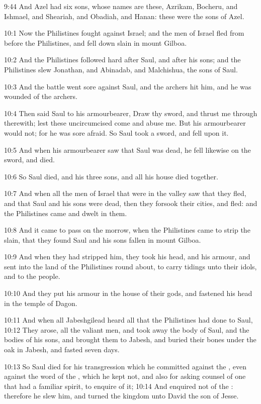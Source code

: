 9:44 And Azel had six sons, whose names are these, Azrikam, Bocheru, and Ishmael, and Sheariah, and Obadiah, and Hanan: these were the sons of Azel.

10:1 Now the Philistines fought against Israel; and the men of Israel fled from before the Philistines, and fell down slain in mount Gilboa.

10:2 And the Philistines followed hard after Saul, and after his sons; and the Philistines slew Jonathan, and Abinadab, and Malchishua, the sons of Saul.

10:3 And the battle went sore against Saul, and the archers hit him, and he was wounded of the archers.

10:4 Then said Saul to his armourbearer, Draw thy sword, and thrust me through therewith; lest these uncircumcised come and abuse me. But his armourbearer would not; for he was sore afraid. So Saul took a sword, and fell upon it.

10:5 And when his armourbearer saw that Saul was dead, he fell likewise on the sword, and died.

10:6 So Saul died, and his three sons, and all his house died together.

10:7 And when all the men of Israel that were in the valley saw that they fled, and that Saul and his sons were dead, then they forsook their cities, and fled: and the Philistines came and dwelt in them.

10:8 And it came to pass on the morrow, when the Philistines came to strip the slain, that they found Saul and his sons fallen in mount Gilboa.

10:9 And when they had stripped him, they took his head, and his armour, and sent into the land of the Philistines round about, to carry tidings unto their idols, and to the people.

10:10 And they put his armour in the house of their gods, and fastened his head in the temple of Dagon.

10:11 And when all Jabeshgilead heard all that the Philistines had done to Saul, 10:12 They arose, all the valiant men, and took away the body of Saul, and the bodies of his sons, and brought them to Jabesh, and buried their bones under the oak in Jabesh, and fasted seven days.

10:13 So Saul died for his transgression which he committed against the \LORD, even against the word of the \LORD, which he kept not, and also for asking counsel of one that had a familiar spirit, to enquire of it; 10:14 And enquired not of the \LORD: therefore he slew him, and turned the kingdom unto David the son of Jesse.

